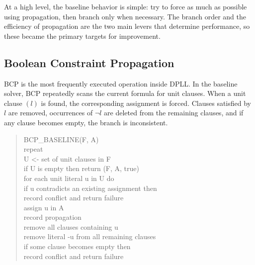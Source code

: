 \documentclass[11pt]{article}
\begin{document}
At a high level, the baseline behavior is simple: try to force as much as
possible using propagation, then branch only when necessary. The branch order
and the efficiency of propagation are the two main levers that determine
performance, so these became the primary targets for improvement.

\subsection{Boolean Constraint Propagation}

BCP is the most frequently executed operation inside DPLL. In the baseline
solver, BCP repeatedly scans the current formula for unit clauses. When a unit
clause $(l)$ is found, the corresponding assignment is forced. Clauses
satisfied by $l$ are removed, occurrences of $\neg l$ are deleted from the
remaining clauses, and if any clause becomes empty, the branch is inconsistent.

\begin{quote}
\small
\ttfamily
\raggedright
BCP\_BASELINE(F, A)\\
\hspace*{1em}repeat\\
\hspace*{2em}U <- set of unit clauses in F\\
\hspace*{2em}if U is empty then return (F, A, true)\\
\hspace*{2em}for each unit literal u in U do\\
\hspace*{3em}if u contradicts an existing assignment then\\
\hspace*{4em}record conflict and return failure\\
\hspace*{3em}assign u in A\\
\hspace*{3em}record propagation\\
\hspace*{3em}remove all clauses containing u\\
\hspace*{3em}remove literal -u from all remaining clauses\\
\hspace*{3em}if some clause becomes empty then\\
\hspace*{4em}record conflict and return failure
\end{quote}
\end{document}
